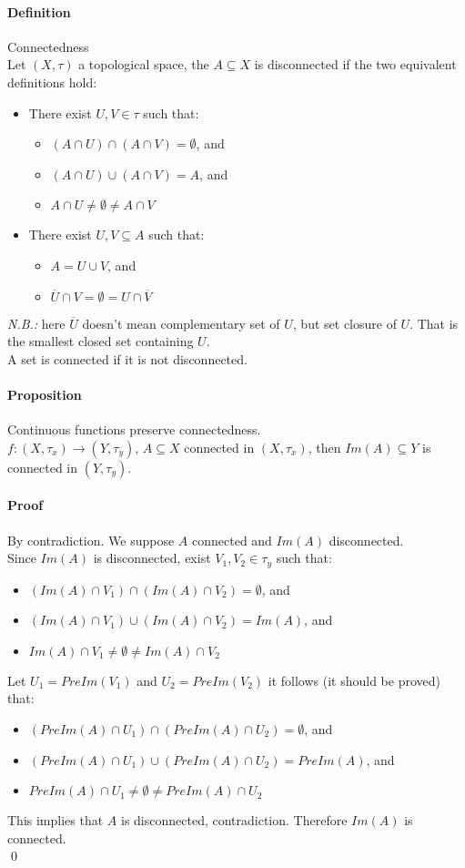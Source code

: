 \documentclass{article}
\newcommand{\func}[3]{#1 : #2 \rightarrow #3}
\newcommand{\Def}{\paragraph{Definition}}
\newcommand{\Proposition}{\paragraph{Proposition}}
\newcommand{\Proof}{\paragraph{Proof}}
\begin{document}
	\Def Connectedness
\\Let $(X, \tau)$ a topological space, the $A \subseteq X$ is disconnected if
	the two equivalent definitions hold:
	\begin{itemize}
		\item There exist $U, V \in \tau$ such that:
		\begin{itemize}
			\item $(A \cap U) \cap (A \cap V) = \emptyset$, and
			\item $(A \cap U) \cup (A \cap V) = A$, and
			\item $A \cap U \neq \emptyset \neq A \cap V$
		\end{itemize}

		\item There exist $U, V \subseteq A$ such that:
		\begin{itemize}
			\item $A = U \cup V$, and
			\item $\overline{U} \cap V = \emptyset = U \cap \overline{V}$
		\end{itemize}
	\end{itemize}
	\textit{N.B.:} here $\overline{U}$ doesn't mean complementary set of $U$, but
	set closure of $U$. That is the smallest closed set containing $U$.
\\A set is connected if it is not disconnected.

	\Proposition Continuous functions preserve connectedness.
\\$\func{f}{(X,\tau_x)}{(Y,\tau_y)}$, $A \subseteq X$ connected in $(X,\tau_x)$,
	then $Im(A) \subseteq Y$ is connected in $(Y,\tau_y)$.

	\Proof By contradiction. We suppose $A$ connected and $Im(A)$ disconnected.
\\Since $Im(A)$ is disconnected, exist $V_1, V_2 \in \tau_y$ such that:
	\begin{itemize}
		\item $(Im(A) \cap V_1) \cap (Im(A) \cap V_2) = \emptyset$, and
		\item $(Im(A) \cap V_1) \cup (Im(A) \cap V_2) = Im(A)$, and
		\item $Im(A) \cap V_1 \neq \emptyset \neq Im(A) \cap V_2$
	\end{itemize}
	Let $U_1 = PreIm(V_1)$ and $U_2 = PreIm(V_2)$ it follows (it should be proved)
	that:
	\begin{itemize}
		\item $(PreIm(A) \cap U_1) \cap (PreIm(A) \cap U_2) = \emptyset$, and
		\item $(PreIm(A) \cap U_1) \cup (PreIm(A) \cap U_2) = PreIm(A)$, and
		\item $PreIm(A) \cap U_1 \neq \emptyset \neq PreIm(A) \cap U_2$
	\end{itemize}
	This implies that $A$ is disconnected, contradiction. Therefore $Im(A)$ is
	connected.
\\\qed
\end{document}
